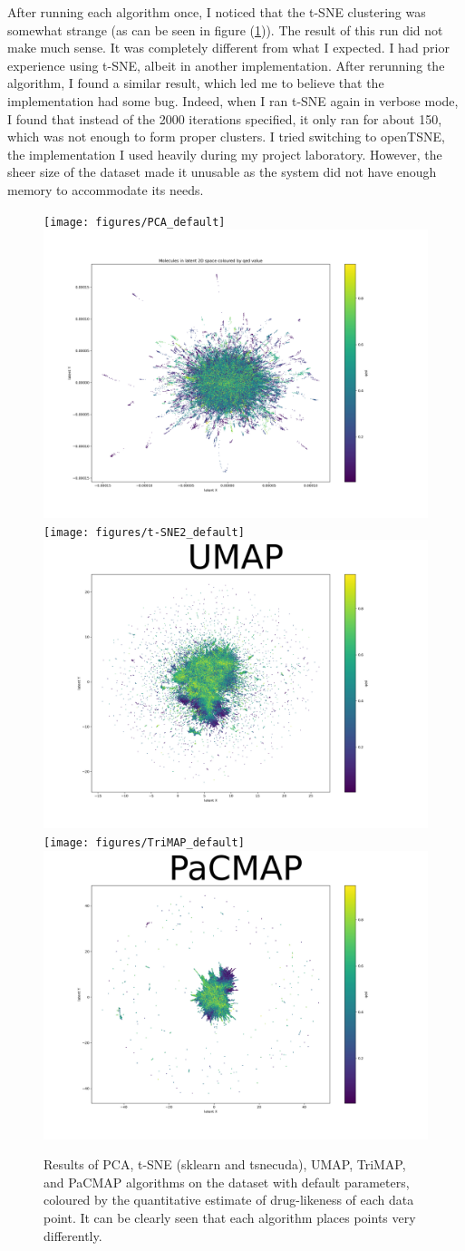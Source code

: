 After running each algorithm once, I noticed that the t-SNE clustering was somewhat strange (as can be seen in figure (\ref{fig:default_run})). The result of this run did not make much sense. It was completely different from what I expected. I had prior experience using t-SNE, albeit in another implementation. After rerunning the algorithm, I found a similar result, which led me to believe that the implementation had some bug. Indeed, when I ran t-SNE again in verbose mode, I found that instead of the 2000 iterations specified, it only ran for about 150, which was not enough to form proper clusters. I tried switching to openTSNE, the implementation I used heavily during my project laboratory. However, the sheer size of the dataset made it unusable as the system did not have enough memory to accommodate its needs.

\begin{figure}[!ht]
	\centering
	\texttt{[image: figures/PCA\_default]}
	\includegraphics[width=0.49\columnwidth, keepaspectratio]{figures/t-SNE_default}
	\texttt{[image: figures/t-SNE2\_default]}
	\includegraphics[width=0.49\columnwidth, keepaspectratio]{figures/UMAP_default}
	\texttt{[image: figures/TriMAP\_default]}
	\includegraphics[width=0.49\columnwidth, keepaspectratio]{figures/PaCMAP_default}
	\caption{Results of PCA, t-SNE (sklearn and tsnecuda), UMAP, TriMAP, and PaCMAP algorithms on the dataset with default parameters, coloured by the quantitative estimate of drug-likeness of each data point. It can be clearly seen that each algorithm places points very differently.}
	\label{fig:default_run}
\end{figure}

